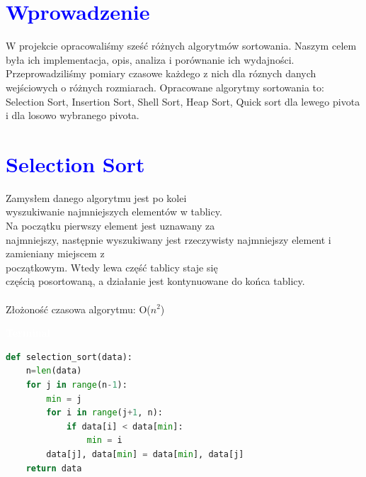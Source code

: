 \documentclass{article}
\begin{document}
	
	\newpage
	
	\titleformat{\section}{\Huge\bfseries}{\thesection}{2em}{}
	
	\section*{\textcolor{blue}{Wprowadzenie}}
	
	W projekcie opracowaliśmy sześć różnych algorytmów sortowania. Naszym celem była ich implementacja, opis, analiza i porównanie ich wydajności. Przeprowadziliśmy pomiary czasowe każdego z nich dla róznych danych wejściowych o różnych rozmiarach. Opracowane algorytmy sortowania to: Selection Sort, Insertion Sort, Shell Sort, Heap Sort, Quick sort dla lewego pivota i dla losowo wybranego pivota.
	
	\titleformat{\section}{\Large\bfseries}{\thesection}{2em}{}
	\section*{\textcolor{blue}{Selection Sort}}
	\begin{multicols}{2}
		\noindent Zamysłem danego algorytmu jest po kolei \\wyszukiwanie najmniejszych elementów w tablicy. \\Na początku pierwszy element jest uznawany za \\najmniejszy, następnie wyszukiwany jest rzeczywisty najmniejszy element i zamieniany miejscem z \\początkowym. Wtedy lewa część tablicy staje się \\częścią posortowaną, a działanie jest kontynuowane do końca tablicy. \\
		\\Złożoność czasowa algorytmu: O($n^2$)
		
		\noindent 
		\begin{tcolorbox}[colback=black,colframe=gray!50!,arc=3mm,boxrule=0pt,left=0pt,right=0pt,width=\linewidth]
			\textcolor{white}{\textbf{\textsf{Terminal}}}\\
			
			\begin{lstlisting}[language=Python]
def selection_sort(data):
	n=len(data)
	for j in range(n-1):
		min = j
		for i in range(j+1, n):
			if data[i] < data[min]:
				min = i
		data[j], data[min] = data[min], data[j]
	return data
			\end{lstlisting}
			
		\end{tcolorbox}
	\end{multicols}
	
\end{document}
